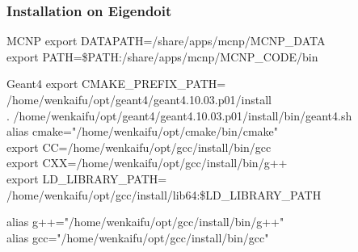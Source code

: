 \documentclass[fleqn]{beamer}
\begin{document}
    

    \begin{frame}
     \frametitle{Installation on Eigendoit}
     \begin{block}{MCNP}
      export DATAPATH=/share/apps/mcnp/MCNP\_DATA\\
      export PATH=\$PATH:/share/apps/mcnp/MCNP\_CODE/bin
     \end{block}

     \begin{block}{Geant4}
     \small
     export CMAKE\_PREFIX\_PATH=\\/home/wenkaifu/opt/geant4/geant4.10.03.p01/install\\
     . /home/wenkaifu/opt/geant4/geant4.10.03.p01/install/bin/geant4.sh\\
     \vspace{.2cm}
     alias cmake="/home/wenkaifu/opt/cmake/bin/cmake"\\
export CC=/home/wenkaifu/opt/gcc/install/bin/gcc\\
export CXX=/home/wenkaifu/opt/gcc/install/bin/g++\\
export LD\_LIBRARY\_PATH=\\/home/wenkaifu/opt/gcc/install/lib64:\$LD\_LIBRARY\_PATH

alias g++="/home/wenkaifu/opt/gcc/install/bin/g++"\\
alias gcc="/home/wenkaifu/opt/gcc/install/bin/gcc"
     \end{block}

    \end{frame}
    
\end{document}
